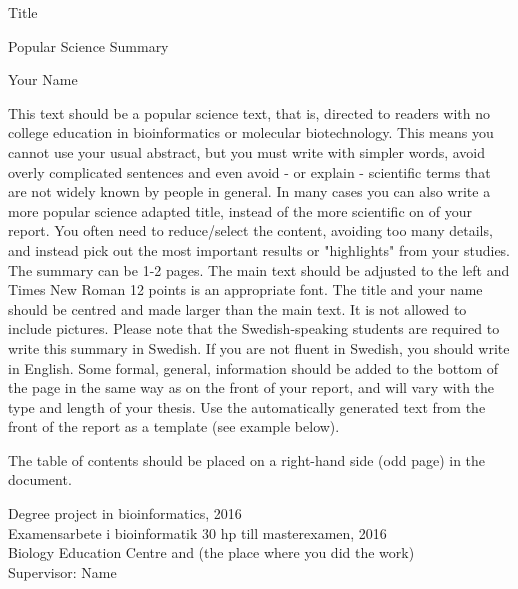 \documentclass[../main.tex]{subfiles}
\begin{document}
\begin{center}
    {\fontsize{18}{20}\selectfont Title}
    
    {\fontsize{14}{16}\selectfont Popular Science Summary}
    
    {\fontsize{14}{16}\selectfont Your Name}
\end{center}

This text should be a popular science text, that is, directed to readers with no college education in bioinformatics or molecular biotechnology. This means you cannot use your usual abstract, but you must write with simpler words, avoid overly complicated sentences and even avoid - or explain - scientific terms that are not widely known by people in general. In many cases you can also write a more popular science adapted title, instead of the more scientific on of your report. You often need to reduce/select the content, avoiding too many details, and instead pick out the most important results or "highlights" from your studies.
The summary can be 1-2 pages. The main text should be adjusted to the left and Times New Roman 12 points is an appropriate font. The title and your name should be centred and made larger than the main text. It is not allowed to include pictures. Please note that the Swedish-speaking students are required to write this summary in Swedish. If you are not fluent in Swedish, you should write in English.
Some formal, general, information should be added to the bottom of the page in the same way as on the front of your report, and will vary with the type and length of your thesis. Use the automatically generated text from the front of the report as a template (see example below).



The table of contents should be placed on a right-hand side (odd page) in the document.

\vspace*{\fill}
\begin{center}
    {\fontsize{10}{12}\selectfont\color{lightgray} 
    Degree project in bioinformatics, 2016\\
    Examensarbete i bioinformatik 30 hp till masterexamen, 2016\\
    Biology Education Centre and (the place where you did the work)\\
    Supervisor: Name}
    

\end{center}
\end{document}
